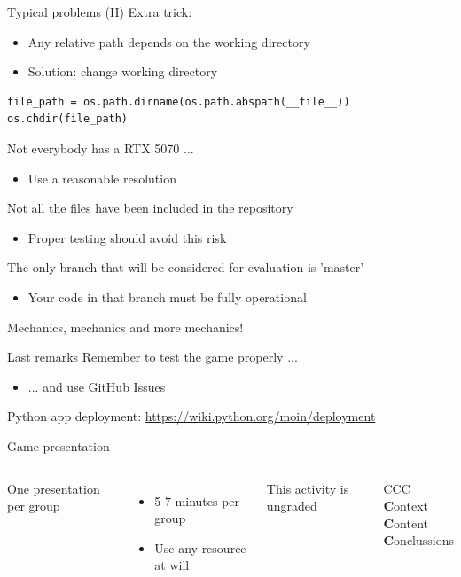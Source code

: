 \documentclass[10pt,compress]{beamer} %
\begin{document}
\begin{frame}[fragile]{Typical problems (II)}
    Extra trick:
    \begin{itemize}
        \item Any relative path depends on the working directory
        \item Solution: change working directory
    \end{itemize}

    \begin{block}{}
    \begin{verbatim}
file_path = os.path.dirname(os.path.abspath(__file__))
os.chdir(file_path)
\end{verbatim}
\end{block}

    Not everybody has a RTX 5070 ...
    \begin{itemize}
        \item Use a reasonable resolution
    \end{itemize}

    Not all the files have been included in the repository
    \begin{itemize}
        \item Proper testing should avoid this risk
    \end{itemize}

    The only branch that will be considered for evaluation is 'master'
    \begin{itemize}
        \item Your code in that branch must be fully operational
    \end{itemize}

    Mechanics, mechanics and more mechanics!
\end{frame}

\begin{frame}{Last remarks}
	Remember to test the game properly ...
	    \begin{itemize}
		    \item ... and use GitHub Issues
	    \end{itemize}
	\bigskip
	Python app deployment: \url{https://wiki.python.org/moin/deployment}
\end{frame}

\begin{frame}{Game presentation}
    \begin{columns}
    One presentation per group
    \begin{itemize}
        \item 5-7 minutes per group
        \item Use any resource at will
    \end{itemize}
    This activity is ungraded


		\begin{block}{CCC}
	    \textbf{C}ontext\\
		\textbf{C}ontent\\
    	\textbf{C}onclussions
		\end{block}
   	\end{columns}
\end{frame}
\end{document}
